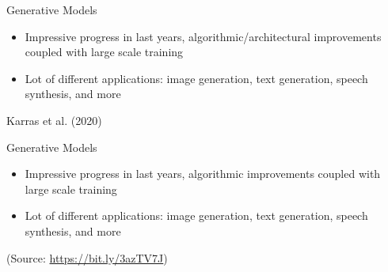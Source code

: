 \begin{frame}{Generative Models}
\protect\hypertarget{generative-models}{}

\begin{itemize}
\tightlist
\item
  Impressive progress in last years, algorithmic/architectural
  improvements coupled with large scale training
\item
  Lot of different applications: image generation, text generation,
  speech synthesis, and more
\end{itemize}


Karras et al. (2020)

\end{frame}

\begin{frame}{Generative Models}
\protect\hypertarget{generative-models-1}{}

\begin{itemize}
\tightlist
\item
  Impressive progress in last years, algorithmic improvements coupled
  with large scale training
\item
  Lot of different applications: image generation, text generation,
  speech synthesis, and more
\end{itemize}


(Source: \url{https://bit.ly/3azTV7J})

\end{frame}

